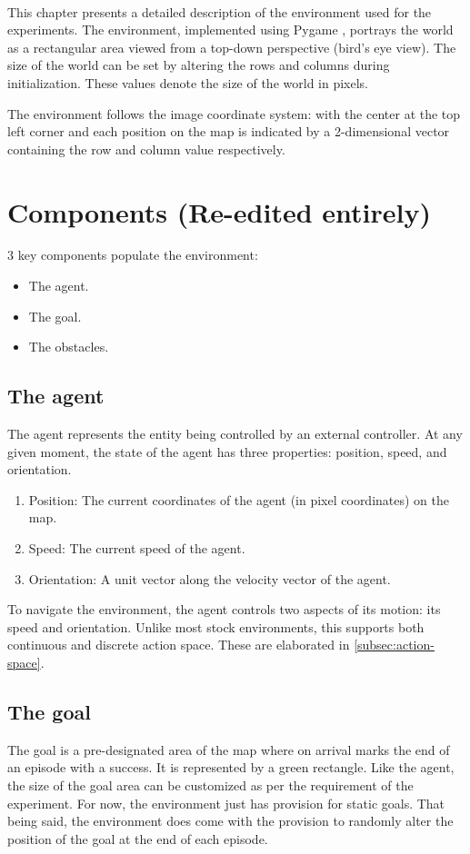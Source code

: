 \label{ch:enviornment}
\\
This chapter presents a detailed description of the environment used for  the experiments. The environment, implemented using Pygame \cite{pygame}, portrays the world as a rectangular area viewed from a top-down perspective (bird's eye view). 
The size of the world can be set by altering the rows and columns during initialization. These values denote the size of the world in pixels.

The environment follows the image coordinate system: with the center at the top left corner and each position on the map is indicated by a 2-dimensional vector containing the row and column value respectively.\\
\section{Components (Re-edited entirely)}
3 key components populate the environment: 
\begin{itemize}
    \item The agent.
    \item The goal.
    \item The obstacles.
\end{itemize}
\subsection{The agent}
The agent represents the entity being controlled by an external controller. At any given moment, the state of the agent has three properties: position, speed, and orientation.
\begin{enumerate}
    \item Position: The current coordinates of the agent (in pixel coordinates) on the map.
    \item Speed: The current speed of the agent.
    \item Orientation: A unit vector along the velocity vector of the agent.
\end{enumerate}
To navigate the environment, the agent controls two aspects of its motion: its speed and orientation.
Unlike most stock environments, this supports both continuous and discrete action space. These are elaborated in \autoref{subsec:action-space}.
\subsection{The goal}
The goal is a pre-designated area of the map where on arrival marks the end of an episode with a success. It is represented by a green rectangle. Like the agent, the size of the goal area can be customized as per the requirement of the experiment. For now, the environment just has provision for static goals. That being said, the environment does come with the provision to randomly alter the position of the goal at the end of each episode.


